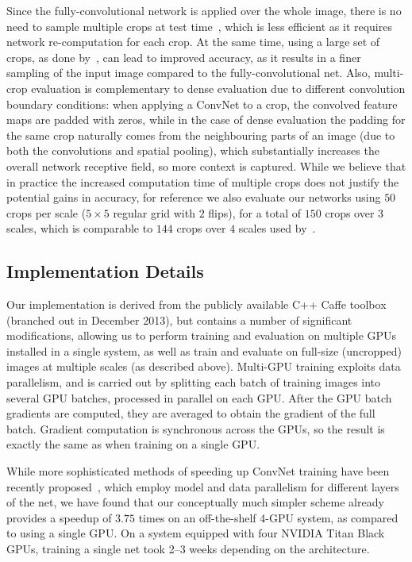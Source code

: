 \documentclass{article} %
\begin{document}
Since the fully-convolutional network is applied over the whole image, there is no need to sample multiple crops at test time~\citep{Krizhevsky12}, which is less efficient as it requires network re-computation for each crop. At the same time, using a large set of crops, as done by~\citet{Szegedy14}, can lead to improved accuracy, as it results in a finer sampling of the input image compared to the fully-convolutional net. 
Also, multi-crop evaluation is complementary to dense evaluation due to different convolution boundary conditions: when applying a ConvNet to a crop, the convolved feature maps are padded with zeros, while 
in the case of dense evaluation the padding for the same crop naturally comes from the neighbouring parts of an image (due to both the convolutions and spatial pooling), which substantially increases the overall network receptive field, so more context is captured.
While we believe that in practice the increased computation time of multiple crops does not justify the potential gains in accuracy, for reference we also evaluate our networks using $50$ crops per scale ($5 \times 5$ regular grid with $2$ flips), for a total of $150$ crops over $3$ scales, which is comparable to $144$ crops over $4$ scales used by~\citet{Szegedy14}.

\subsection{Implementation Details}
Our implementation is derived from the publicly available C++ Caffe toolbox~\citep{Jia13} (branched out in December 2013), but contains a number of significant modifications, 
allowing us to perform training and evaluation on multiple GPUs installed in a single system, as well as train and evaluate on full-size (uncropped) images at multiple scales (as described above).
Multi-GPU training exploits data parallelism, and is carried out by splitting each batch of training images into several GPU batches, processed in parallel on each GPU. 
After the GPU batch gradients are computed, they are averaged to obtain the gradient of the full batch.
Gradient computation is synchronous across the GPUs, so the result is exactly the same as when training on a single GPU.

While more sophisticated methods of speeding up ConvNet training have been recently proposed~\citep{Krizhevsky14}, which employ model and data parallelism for different layers
of the net, we have found that our conceptually much simpler scheme already provides a speedup of $3.75$ times on an off-the-shelf \mbox{4-GPU} system, as compared to using a single GPU.
On a system equipped with four NVIDIA Titan Black GPUs, training a single net took 2--3 weeks depending on the architecture.
\end{document}

